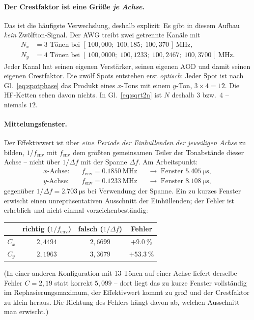 \documentclass[11pt,a4paper]{article}
\newcommand{\crest}{\ensuremath{C}}
\begin{document}
\paragraph{Der Crestfaktor ist eine Größe \emph{je Achse}.}
Das ist die häufigste Verwechslung, deshalb explizit: Es gibt in diesem
Aufbau \emph{kein} Zwölfton-Signal. Der AWG treibt zwei getrennte Kanäle mit
\begin{align}
  N_x &= 3 \text{ Tönen bei } [\,100{,}000;\;100{,}185;\;100{,}370\,]\,\si{\mega\hertz},\\
  N_y &= 4 \text{ Tönen bei } [\,100{,}0000;\;100{,}1233;\;100{,}2467;\;100{,}3700\,]\,\si{\mega\hertz}.
\end{align}
Jeder Kanal hat seinen eigenen Verstärker, seinen eigenen AOD und damit
seinen eigenen Crestfaktor. Die zwölf Spots entstehen erst \emph{optisch}:
Jeder Spot ist nach Gl.~\eqref{eq:spotphase} das Produkt eines $x$-Tons mit
einem $y$-Ton, $3\times4 = 12$. Die HF-Ketten sehen davon nichts. In
Gl.~\eqref{eq:sqrt2n} ist $N$ deshalb $3$ bzw.\ $4$ -- niemals $12$.

\paragraph{Mittelungsfenster.}
Der Effektivwert ist über \emph{eine Periode der Einhüllenden der jeweiligen
Achse} zu bilden, $1/f_\mathrm{env}$ mit $f_\mathrm{env}$ dem größten
gemeinsamen Teiler der Tonabstände dieser Achse -- nicht über $1/\Delta f$
mit der Spanne $\Delta f$. Am Arbeitspunkt:
\begin{align}
  \text{$x$-Achse:}\quad & f_\mathrm{env} = \SI{0.1850}{\mega\hertz}
    && \rightarrow\; \text{Fenster } \SI{5.405}{\micro\second},\\
  \text{$y$-Achse:}\quad & f_\mathrm{env} = \SI{0.1233}{\mega\hertz}
    && \rightarrow\; \text{Fenster } \SI{8.108}{\micro\second},
\end{align}
gegenüber $1/\Delta f = \SI{2.703}{\micro\second}$ bei Verwendung der Spanne.
Ein zu kurzes Fenster erwischt einen unrepräsentativen Ausschnitt der
Einhüllenden; der Fehler ist erheblich und nicht einmal
vorzeichenbeständig:
\begin{center}
\begin{tabular}{lccc}
  \toprule
  & richtig ($1/f_\mathrm{env}$) & falsch ($1/\Delta f$) & Fehler\\
  \midrule
  $\crest_x$ & $2{,}4494$ & $2{,}6699$ & $+\SI{9.0}{\percent}$\\
  $\crest_y$ & $2{,}1963$ & $3{,}3679$ & $+\SI{53.3}{\percent}$\\
  \bottomrule
\end{tabular}
\end{center}
(In einer anderen Konfiguration mit 13 Tönen auf einer Achse liefert derselbe
Fehler $\crest = 2{,}19$ statt korrekt $5{,}099$ -- dort liegt das zu kurze
Fenster vollständig im Rephasierungsmaximum, der Effektivwert kommt zu groß
und der Crestfaktor zu klein heraus. Die Richtung des Fehlers hängt davon ab,
welchen Ausschnitt man erwischt.)
\end{document}
